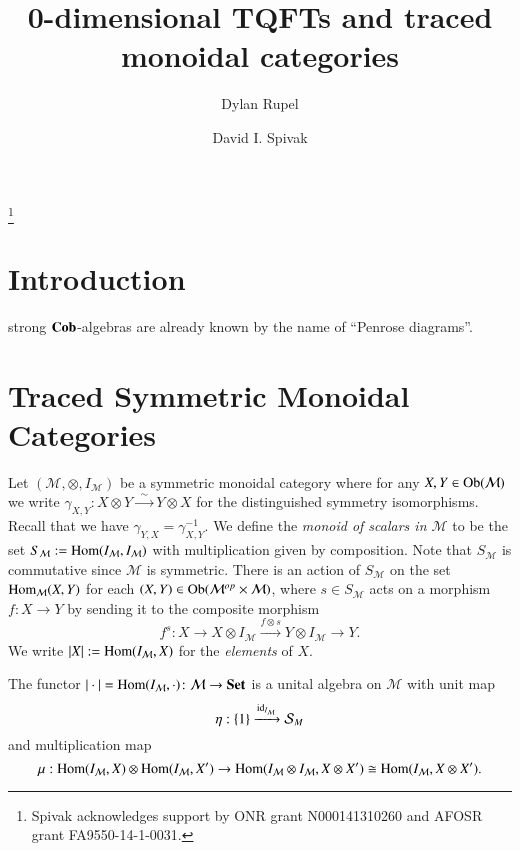 \documentclass{amsart}
\def\tn{\textnormal}
\def\mc{\mathcal}
\def\Hom{\tn{Hom}}
\def\Ob{\tn{Ob}}
\def\to{\rightarrow}
\def\taking{\colon}
\def\iso{\cong}
\newcommand{\To}[1]{\xrightarrow{#1}}
\newcommand{\Too}[1]{\xrightarrow{\ \ #1\ \ }}
\def\id{\tn{id}}
\def\Cob{{\bf Cob}}
\def\Set{{\bf Set}}
\def\mcM{\mc{M}}
\def\mcS{\mc{S}}
\theoremstyle{remark}
\theoremstyle{definition}
\begin{document}
\title{0-dimensional TQFTs and traced monoidal categories}

\author{Dylan Rupel}
\address{Northeastern University\\360 Huntington Ave.\\Boston, MA 02115}

\author{David I. Spivak}
\address{Massachusetts Institute of Technology\\77 Massachusetts Ave.\\Cambridge, MA 02139}

\thanks{Spivak acknowledges support by ONR grant N000141310260 and AFOSR grant FA9550-14-1-0031.}


\maketitle

\tableofcontents

\section{Introduction}

 strong $\Cob$-algebras are already known by the name of ``Penrose diagrams''. 


\section{Traced Symmetric Monoidal Categories}

 Let $(\mcM,\otimes,I_\mcM)$ be a symmetric monoidal category where for any $X,Y\in\Ob(\mcM)$ we write $\gamma_{X,Y}:X\otimes Y\Too{\sim} Y\otimes X$ for the distinguished symmetry isomorphisms. Recall that we have $\gamma_{Y,X}=\gamma_{X,Y}^{-1}$.  We define the {\em monoid of scalars in $\mcM$} to be the set $S_\mcM:=\Hom(I_\mcM,I_\mcM)$ with multiplication given by composition.  Note that $S_\mcM$ is commutative since $\mcM$ is symmetric.  There is an action of $S_\mcM$ on the set $\Hom_\mcM(X,Y)$ for each $(X,Y)\in\Ob(\mcM^{op}\times\mcM)$, where $s\in S_\mcM$ acts on a morphism $f\taking X\to Y$ by sending it to the composite morphism
$$f^s:X\to X\otimes I_\mcM\To{f\otimes s}Y\otimes I_\mcM\to Y.$$
We write $|X|:=\Hom(I_\mcM,X)$ for the \emph{elements} of $X$.

The functor $|\cdot|=\Hom(I_\mcM,\cdot)\taking\mcM\to\Set$ is a unital algebra on $\mcM$ with unit map
\[\eta:\{1\}\To{\id_{I_\mcM}}\mcS_M\]
and multiplication map
\[\mu:\Hom(I_\mcM,X)\otimes\Hom(I_\mcM,X')\to\Hom(I_\mcM\otimes I_\mcM,X\otimes X')\iso\Hom(I_\mcM,X\otimes X').\]
\end{document}
